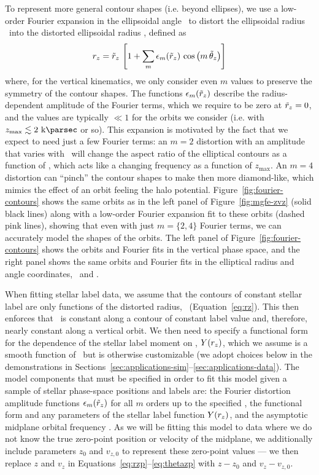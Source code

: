To represent more general contour shapes (i.e. beyond ellipses), we use a low-order
Fourier expansion in the ellipsoidal angle \thzp\ to distort the ellipsoidal radius
\rzp\ into the distorted ellipsoidal radius \rz, defined as
\begin{equation}
    r_z = \tilde{r}_z \, \left[1 + \sum_m \epsilon_m(\tilde{r}_z) \, \cos{\left(m\,\ensuremath{\tilde{\theta}_z}\right)}\right] \label{eq:rz}
\end{equation}
where, for the vertical kinematics, we only consider even $m$ values to preserve the
symmetry of the contour shapes.
The functions $\epsilon_m(\tilde{r}_z)$ describe the radius-dependent amplitude of the Fourier
terms, which we require to be zero at $\tilde{r}_z=0$, and the values are typically $\ll 1$
for the orbits we consider (i.e. with $\zmax \lesssim 2~\kpc$ or so).
This expansion is motivated by the fact that we expect to need just a few Fourier terms:
an $m=2$ distortion with an amplitude that varies with \rzp\ will change the aspect
ratio of the elliptical contours as a function of \rzp, which acts like a changing
frequency as a function of $z_{\textrm{max}}$.
An $m=4$ distortion can ``pinch'' the contour shapes to make then more diamond-like,
which mimics the effect of an orbit feeling the halo potential.
Figure~\ref{fig:fourier-contours} shows the same orbits as in the left panel of
Figure~\ref{fig:mgfe-zvz} (solid black lines) along with a low-order Fourier expansion
fit to these orbits (dashed pink lines), showing that even with just $m=\{2, 4\}$
Fourier terms, we can accurately model the shapes of the orbits.
The left panel of Figure~\ref{fig:fourier-contours} shows the orbits and Fourier fits in
the vertical phase space, and the right panel shows the same orbits and Fourier fits in
the elliptical radius and angle coordinates, \rzp\ and \thzp.

When fitting stellar label data, we assume that the contours of constant stellar label
are only functions of the distorted radius, \rz\ (Equation~\ref{eq:rz}).
This then enforces that \rz\ is constant along a contour of constant label value and,
therefore, nearly constant along a vertical orbit.
We then need to specify a functional form for the dependence of the stellar label moment
on \rz, $Y(r_z)$, which we assume is a smooth function of \rz\ but is otherwise
customizable (we adopt choices below in the demonstrations in
Sections~\ref{sec:applications-sim}--\ref{sec:applications-data}).
The model components that must be specified in order to fit this model given a sample of
stellar phase-space positions and labels are: the Fourier distortion amplitude functions
$\epsilon_m(\tilde{r}_z)$ for all $m$ orders up to the specified \mmax, the functional form and
any parameters of the stellar label function $Y(r_z)$, and the asymptotic midplane
orbital frequency \freqzero.
As we will be fitting this model to data where we do not know the true zero-point
position or velocity of the midplane, we additionally include parameters $z_0$ and
$v_{z,0}$ to represent these zero-point values --- we then replace $z$ and $v_z$ in
Equations~\ref{eq:rzp}--\ref{eq:thetazp} with $z-z_0$ and $v_z - v_{z, 0}$.

